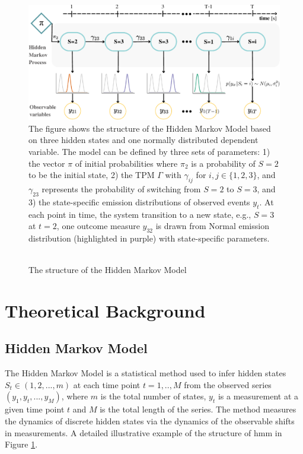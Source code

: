 \begin{figure}[h]
\caption{\\The structure of the Hidden Markov Model}
\includegraphics[width=\textwidth]{graphics/time_hmm_2.pdf}
\flushleft
\footnotesize
\justifying
The figure shows the structure of the Hidden Markov Model based on three hidden states and one normally distributed dependent variable. The model can be defined by three sets of parameters: 1) the vector $\pi$ of initial probabilities where $\pi_2$ is a probability of $S=2$ to be the initial state, 2) the TPM $\Gamma$ with $\gamma_{ij}$ for ${i,j \in \{1,2,3\}}$, and $\gamma_{23}$ represents the probability of switching from $S=2$ to $S=3$, and 3) the state-specific emission distributions of observed events $y_t$. At each point in time, the system transition to a new state, e.g., $S=3$ at $t=2$, one outcome measure $y_{32}$ is drawn from Normal emission distribution (highlighted in purple) with state-specific parameters.
 \label{hmm_fig}
\end{figure}
\section{Theoretical Background}
\subsection{Hidden Markov Model}
The Hidden Markov Model is a statistical method used to infer hidden states ${S_t \in (1,2,...,m)}$ at each time point ${t=1,.., M}$ from the observed series ${(y_1,y_t,...,y_M)}$, where $m$ is the total number of states, $y_t$ is a measurement at a given time point $t$ and $M$ is the total length of the series. The method measures the dynamics of discrete hidden states via the dynamics of the observable shifts in measurements. A detailed illustrative example of the structure of \ac{hmm} in Figure \ref{hmm_fig}. 


